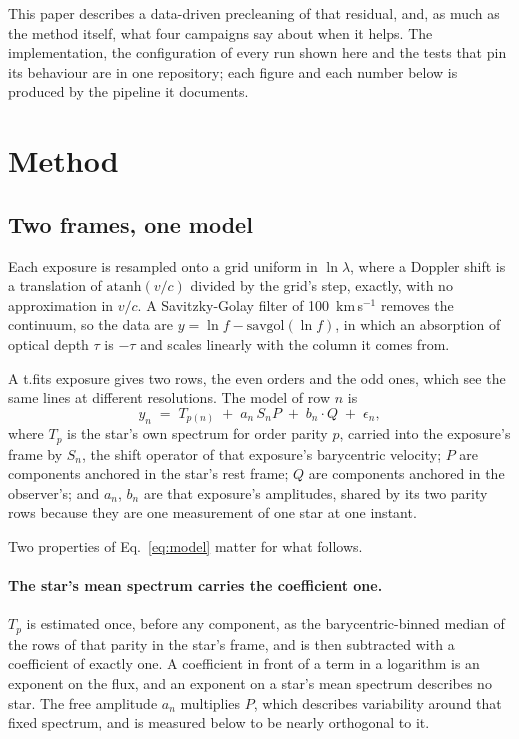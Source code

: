 \documentclass[11pt]{article}
\begin{document}
This paper describes a data-driven precleaning of that residual, and, as much
as the method itself, what four campaigns say about when it helps. The
implementation, the configuration of every run shown here and the tests that
pin its behaviour are in one repository; each figure and each number below is
produced by the pipeline it documents.

\section{Method}

\subsection{Two frames, one model}

Each exposure is resampled onto a grid uniform in $\ln \lambda$, where a
Doppler shift is a translation of $\mathrm{atanh}(v/c)$ divided by the grid's
step, exactly, with no approximation in $v/c$. A Savitzky-Golay filter of
100~km\,s$^{-1}$ removes the continuum, so the data are
$y = \ln f - \mathrm{savgol}(\ln f)$, in which an absorption of optical depth
$\tau$ is $-\tau$ and scales linearly with the column it comes from.

A t.fits exposure gives two rows, the even orders and the odd ones, which see
the same lines at different resolutions. The model of row $n$ is
%
\begin{equation}
  y_n \;=\; T_{p(n)} \;+\; a_n \, S_n P \;+\; b_n \cdot Q \;+\; \epsilon_n ,
  \label{eq:model}
\end{equation}
%
where $T_p$ is the star's own spectrum for order parity $p$, carried into the
exposure's frame by $S_n$, the shift operator of that exposure's barycentric
velocity; $P$ are components anchored in the star's rest frame; $Q$ are
components anchored in the observer's; and $a_n$, $b_n$ are that exposure's
amplitudes, shared by its two parity rows because they are one measurement of
one star at one instant.

Two properties of Eq.~\ref{eq:model} matter for what follows.

\paragraph{The star's mean spectrum carries the coefficient one.} $T_p$ is
estimated once, before any component, as the barycentric-binned median of the
rows of that parity in the star's frame, and is then subtracted with a
coefficient of exactly one. A coefficient in front of a term in a logarithm is
an exponent on the flux, and an exponent on a star's mean spectrum describes no
star. The free amplitude $a_n$ multiplies $P$, which describes variability
around that fixed spectrum, and is measured below to be nearly orthogonal to
it.
\end{document}
